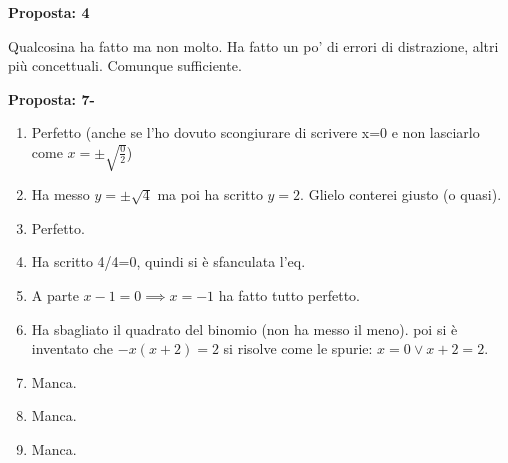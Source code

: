 \documentclass[11pt]{report}
\begin{document}
\begin{description}
\textbf{Proposta: 4}

\item[PIECOL] Qualcosina ha fatto ma non molto. Ha fatto un po' di errori di distrazione, altri più concettuali. Comunque sufficiente.

\textbf{Proposta: 7-}

\begin{enumerate}
    \item Perfetto (anche se l'ho dovuto scongiurare di scrivere x=0 e non lasciarlo come $x=\pm\sqrt{\frac 02}$)
    \item Ha messo $y=\pm\sqrt 4$ ma poi ha scritto $y=2$. Glielo conterei giusto (o quasi).
    \item Perfetto.
    \item Ha scritto 4/4=0, quindi si è sfanculata l'eq.
    \item A parte $x-1=0 \implies x=-1$ ha fatto tutto perfetto.
    \item Ha sbagliato il quadrato del binomio (non ha messo il meno). poi si è inventato che $-x(x+2)=2$ si risolve come le spurie: $x=0 \vee x+2=2$.
    \item Manca.
    \item Manca.
    \item Manca.
\end{enumerate}

\end{description}
\end{document}
